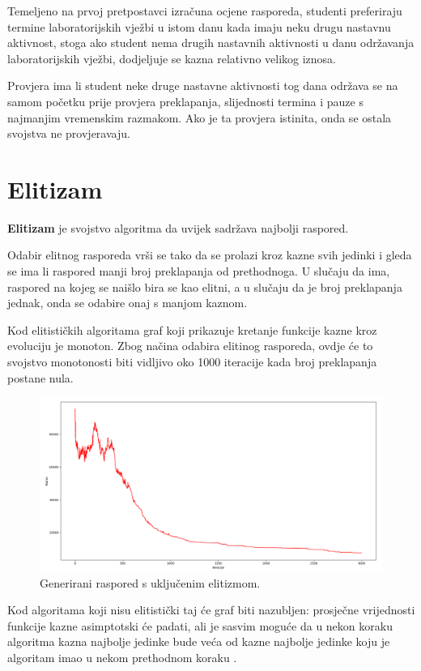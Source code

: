 \documentclass[times, utf8, zavrsni]{fer}
\begin{document}
Temeljeno na prvoj pretpostavci izračuna ocjene rasporeda, studenti preferiraju termine laboratorijskih vježbi u istom danu kada imaju neku drugu nastavnu aktivnost, stoga ako student nema drugih nastavnih aktivnosti u danu održavanja laboratorijskih vježbi, dodjeljuje se kazna relativno velikog iznosa.

Provjera ima li student neke druge nastavne aktivnosti tog dana održava se na samom početku prije provjera preklapanja, slijednosti termina i pauze s najmanjim vremenskim razmakom. Ako je ta provjera istinita, onda se ostala svojstva ne provjeravaju.

\section{Elitizam}

\textbf{Elitizam}  je svojstvo algoritma da uvijek sadržava najbolji raspored.

Odabir elitnog rasporeda vrši se tako da se prolazi kroz kazne svih jedinki i gleda se ima li raspored manji broj preklapanja od prethodnoga. U slučaju da ima, raspored na kojeg se naišlo bira se kao elitni, a u slučaju da je broj preklapanja jednak, onda se odabire onaj s manjom kaznom.

Kod elitističkih algoritama graf koji prikazuje kretanje funkcije kazne kroz evoluciju je monoton. Zbog načina odabira elitinog rasporeda, ovdje će to svojstvo monotonosti biti vidljivo oko 1000 iteracije kada broj preklapanja postane nula.

\begin{figure}[htb]
\centering
\includegraphics[width=14cm]{images/elitizam_da.png}
\caption{Generirani raspored s uključenim elitizmom.}
\label{fig:elitiziam_da}
\end{figure}

Kod algoritama koji nisu elitistički taj će graf biti nazubljen: prosječne vrijednosti funkcije kazne asimptotski će padati, ali je sasvim moguće da u nekon koraku algoritma kazna najbolje jedinke bude veća od kazne najbolje jedinke koju je algoritam imao u nekom prethodnom koraku \citep{cupic-skripta}.
\end{document}
